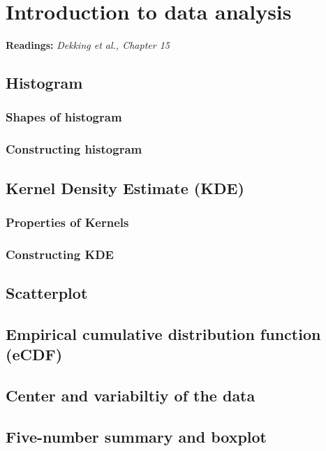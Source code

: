 \documentclass[a4paper]{article}
\begin{document}
\section{Introduction to data analysis}
\textbf{Readings:} \textit{Dekking et al., Chapter 15}
\newline
\begin{mdframed}[style=Summary]
    
\end{mdframed}
        \subsection{Histogram}
        \subsubsection*{Shapes of histogram}
        \subsubsection*{Constructing histogram}
    \subsection{Kernel Density Estimate (KDE)}
        \subsubsection*{Properties of Kernels}
        \subsubsection*{Constructing KDE}
    \subsection{Scatterplot}

    \subsection{Empirical cumulative distribution function (eCDF)}
    \subsection{Center and variabiltiy of the data}
    \subsection{Five-number summary and boxplot}
\end{document}
